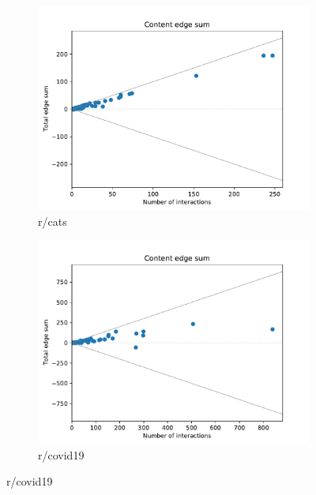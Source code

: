 \begin{figure}
	\begin{center}
		\begin{subfigure}[b]{0.4\textwidth}
			\centering
			\includegraphics[width=\textwidth]{tex/out/cats200/edge-sum-n-interactions.pdf}
			\caption{r/cats}
			\label{fig:tex/out/cats200/edge-sum-n-interactions.pdf}
		\end{subfigure}
		\begin{subfigure}[b]{0.4\textwidth}
			\centering
			\includegraphics[width=\textwidth]{tex/out/covid19200/edge-sum-n-interactions.pdf}
			\caption{r/covid19}
			\label{fig:tex/out/covid19200/edge-sum-n-interactions.pdf}
		\end{subfigure}

\end{center}
\end{figure}
